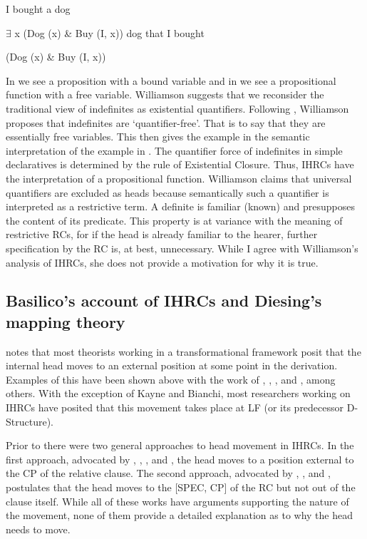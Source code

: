 \documentclass[output=paper]{LSP/langsci}
\begin{document}
\ea I bought a dog	\label{boyle40}

$\exists$ x (Dog (x) \& Buy (I, x))
\ex dog that I bought \label{boyle41}

(Dog (x) \& Buy (I, x))
\z	
	
In  we see a proposition with a bound variable and in  we see a propositional function with a free variable. Williamson suggests that we reconsider the traditional view of indefinites as existential quantifiers. Following \citet{Heim1982}, Williamson proposes that indefinites are `quantifier-free'. That is to say that they are essentially free variables. This then gives the example in  the semantic interpretation of the example in . The quantifier force of indefinites in simple declaratives is determined by the rule of Existential Closure. Thus, IHRCs have the interpretation of a propositional function. Williamson claims that universal quantifiers are excluded as heads because semantically such a quantifier is interpreted as a restrictive term. A definite is familiar (known) and presupposes the content of its predicate.  This property is at variance with the meaning of restrictive RCs, for if the head is already familiar to the hearer, further specification by the RC is, at best, unnecessary.  While I agree with Williamson's analysis of IHRCs, she does not provide a motivation for why it is true.

\subsection{Basilico's account of IHRCs and Diesing's mapping theory}\label{sec:boyle:6.3}

\citet{Basilico1996} notes that most theorists working in a transformational framework posit that the internal head moves to an external position at some point in the derivation. Examples of this have been shown above with the work of \citet{Cole1982, Cole1987}, \citet{Williamson1987}, \citet{Culy1990}, \citet{Kayne1994} and \citet{Bianchi1999}, among others. With the exception of Kayne and Bianchi, most researchers working on IHRCs have posited that this movement takes place at LF (or its predecessor D-Structure). 

Prior to \citet{Basilico1996} there were two general approaches to head movement in IHRCs. In the first approach, advocated by \citet{Broadwell1985, Broadwell1987}, \citet{Cole1987}, \citet{LefebvreMuysken1988}, and \citet{ColeHermon1994}, the head moves to a position external to the CP of the relative clause. The second approach, advocated by \citet{Williamson1987}, \citet{Brassetal1989}, and \citet{Bonneau1992}, postulates that the head moves to the [SPEC, CP] of the RC but not out of the clause itself. While all of these works have arguments supporting the nature of the movement, none of them provide a detailed explanation as to why the head needs to move.  
\end{document}
